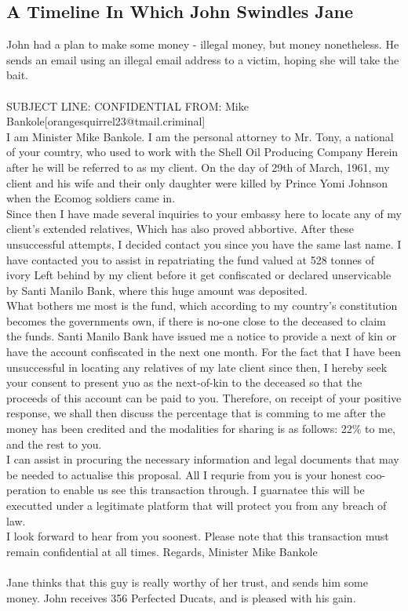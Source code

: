 \documentclass{article}
\begin{document}
\subsection{A Timeline In Which John Swindles Jane}


John had a plan to make some money {-} illegal money, but money nonetheless.
He sends an email using an illegal email address to a victim, hoping she will take the bait.
\\\\
SUBJECT LINE: CONFIDENTIAL
FROM: Mike Bankole[orangesquirrel23@tmail.criminal]
\\
I am Minister Mike Bankole.
I am the personal attorney to Mr. Tony, a national of your country, who used to work with the Shell Oil Producing Company
Herein after he will be referred to as my client.
On the day of 29th of March, 1961, my client and his wife and their only daughter were killed by Prince Yomi Johnson when the Ecomog soldiers came in.
\\
Since then I have made several inquiries to your embassy here to locate any of my client's extended relatives, Which has also proved abbortive.
After these unsuccessful attempts, I decided contact you since you have the same last name.
I have contacted you to assist in repatriating the fund valued at 528 tonnes of ivory Left behind by my client before it get confiscated or declared unservicable by Santi Manilo Bank, where this huge amount was deposited.
\\
What bothers me most is the fund, which according to my country's constitution becomes the governments own, if there is no{-}one close to the deceased to claim the funds.
Santi Manilo Bank have issued me a notice to provide a next of kin or have the account confiscated in the next one month.
For the fact that I have been unsuccessful in locating any relatives of my late client since then, I hereby seek your consent to present yuo as the next{-}of{-}kin to the deceased so that the proceeds of this account can be paid to you.
Therefore, on receipt of your positive response, we shall then discuss the percentage that is comming to me after the money has been credited and the modalities for sharing is as follows: 22\% to me, and the rest to you.
\\
I can assist in procuring the necessary information and legal documents that may be needed to actualise this proposal.
All I requrie from you is your honest coo{-}peration to enable us see this transaction through.
I guarnatee this will be executted under a legitimate platform that will protect you from any breach of law.
\\
I look forward to hear from you soonest.
Please note that this transaction must remain confidential at all times.
Regards, Minister Mike Bankole
\\\\
Jane thinks that this guy is really worthy of her trust, and sends him some money.
John receives 356 Perfected Ducats, and is pleased with his gain.
\end{document}
